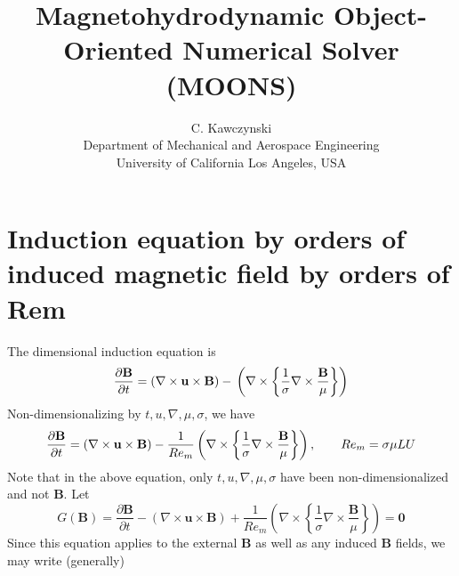 \documentclass[11pt]{article}
\newcommand{\B}{\mathbf{B}}
\newcommand{\PD}{\partial}
\newcommand{\U}{\mathbf{u}}
\begin{document}
\doublespacing
\title{Magnetohydrodynamic Object-Oriented Numerical Solver (MOONS)}
\author{C. Kawczynski \\
Department of Mechanical and Aerospace Engineering \\
University of California Los Angeles, USA\\
}

\section{Induction equation by orders of induced magnetic field by orders of Rem}
The dimensional induction equation is
\begin{equation} \label{eq:ind_dim}
  \frac{\PD \B}{\PD t} 
  =
  (\nabla \times \U \times \B)
  - \\
  \left(
  \nabla \times
  \left\{
  \frac{1}{\sigma}
  \nabla \times
  \frac{\B}{\mu}
  \right\}
  \right)
\end{equation}
Non-dimensionalizing by $t,u,\nabla , \mu, \sigma$, we have
\begin{equation} \label{eq:ind}
  \frac{\PD \B}{\PD t} 
  =
  (\nabla \times \U \times \B)
  - \\
  \frac{1}{Re_m}
  \left(
  \nabla \times
  \left\{
  \frac{1}{\sigma}
  \nabla \times
  \frac{\B}{\mu}
  \right\}
  \right)
  ,\qquad Re_m = \sigma \mu LU
\end{equation}
Note that in the above equation, only $t,u,\nabla , \mu, \sigma$ have been non-dimensionalized and not $\B$. Let
\begin{equation}
  G(\B)
  =
  \frac{\PD \B}{\PD t} 
  -
  (\nabla \times \U \times \B)
  +
  \frac{1}{Re_m}
  \left(
  \nabla \times
  \left\{
  \frac{1}{\sigma}
  \nabla \times
  \frac{\B}{\mu}
  \right\}
  \right)
  =
  \mathbf{0}
\end{equation}
Since this equation applies to the external $\B$ as well as any induced $\B$ fields, we may write (generally)
\end{document}
